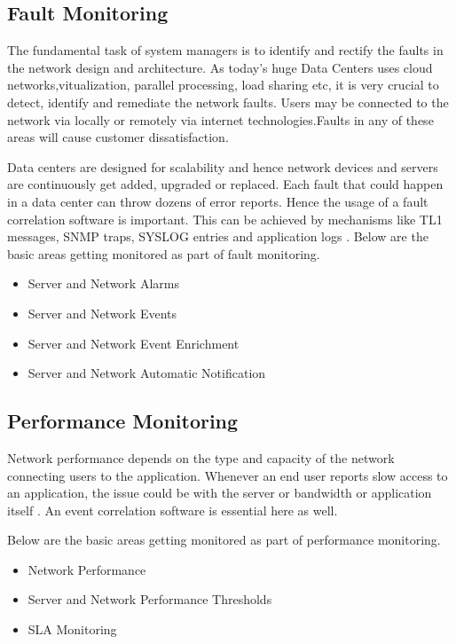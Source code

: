 \documentclass[sigconf]{acmart}
\begin{document}
\subsection{Fault Monitoring}

The fundamental task of system managers is to identify and rectify the faults in the network design and architecture. As today's huge Data Centers uses cloud networks,vitualization, parallel processing, load sharing etc, it is very crucial to detect, identify and remediate the network faults. Users may be connected to the network via locally or remotely via internet technologies.Faults in any of these areas will cause customer dissatisfaction. 

Data centers are designed for scalability and hence network devices and servers are continuously get added, upgraded or replaced. Each fault that could happen in a data center can throw dozens of error reports. Hence the usage of a fault correlation software is important. This can be achieved by mechanisms like TL1 messages, SNMP traps, SYSLOG entries and application logs \cite{network-fault-management-in-todays-complex-data-centers}. Below are the basic areas getting monitored as part of fault monitoring.

\begin{itemize}
\item Server and Network Alarms
\item Server and Network Events
\item Server and Network Event Enrichment
\item Server and Network Automatic Notification
\end{itemize}

\subsection{Performance Monitoring}

Network performance depends on the type and capacity of the network connecting users to the application. Whenever an end user reports slow access to an application, the issue could be with the server or bandwidth or application itself \cite{network-monitoring-datacenter-management}. An event correlation software is essential here as well.

Below are the basic areas getting monitored as part of performance monitoring.

\begin{itemize}
\item Network Performance
\item Server and Network Performance Thresholds
\item SLA Monitoring
\end{itemize}
\end{document}
